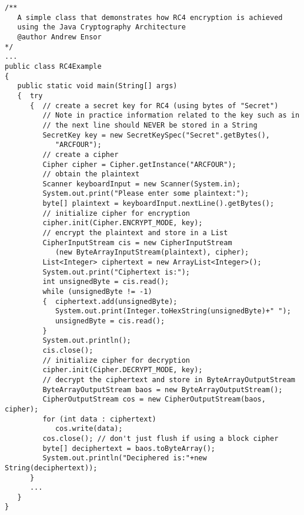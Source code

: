 \begin{figure*}\begin{program}\begin{verbatim}
/**
   A simple class that demonstrates how RC4 encryption is achieved
   using the Java Cryptography Architecture
   @author Andrew Ensor
*/
...
public class RC4Example
{
   public static void main(String[] args)
   {  try
      {  // create a secret key for RC4 (using bytes of "Secret")
         // Note in practice information related to the key such as in
         // the next line should NEVER be stored in a String
         SecretKey key = new SecretKeySpec("Secret".getBytes(),
            "ARCFOUR");
         // create a cipher
         Cipher cipher = Cipher.getInstance("ARCFOUR");
         // obtain the plaintext
         Scanner keyboardInput = new Scanner(System.in);
         System.out.print("Please enter some plaintext:");
         byte[] plaintext = keyboardInput.nextLine().getBytes();
         // initialize cipher for encryption
         cipher.init(Cipher.ENCRYPT_MODE, key);
         // encrypt the plaintext and store in a List
         CipherInputStream cis = new CipherInputStream
            (new ByteArrayInputStream(plaintext), cipher);
         List<Integer> ciphertext = new ArrayList<Integer>();
         System.out.print("Ciphertext is:");
         int unsignedByte = cis.read();
         while (unsignedByte != -1)
         {  ciphertext.add(unsignedByte);
            System.out.print(Integer.toHexString(unsignedByte)+" ");
            unsignedByte = cis.read();
         }
         System.out.println();
         cis.close();
         // initialize cipher for decryption
         cipher.init(Cipher.DECRYPT_MODE, key);
         // decrypt the ciphertext and store in ByteArrayOutputStream
         ByteArrayOutputStream baos = new ByteArrayOutputStream();
         CipherOutputStream cos = new CipherOutputStream(baos, cipher);
         for (int data : ciphertext)
            cos.write(data);
         cos.close(); // don't just flush if using a block cipher
         byte[] deciphertext = baos.toByteArray();
         System.out.println("Deciphered is:"+new String(deciphertext));
      }
      ...
   }
}
\end{verbatim}\end{program}\end{figure*}

